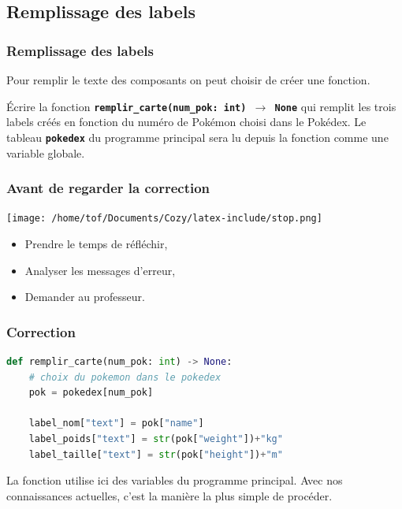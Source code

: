 \documentclass[svgnames,11pt]{beamer}
\begin{document}
\subsection{Remplissage des labels}
\begin{frame}
    \frametitle{Remplissage des labels}

    Pour remplir le texte des composants on peut choisir de créer une fonction.
    \begin{activite}
        Écrire la fonction \textbf{\texttt{remplir\_carte(num\_pok: int) $\rightarrow$ None}} qui remplit les trois labels créés en fonction du numéro de Pokémon choisi dans le Pokédex. Le tableau \textbf{\texttt{pokedex}} du programme principal sera lu depuis la fonction comme une variable globale.
    \end{activite}
\end{frame}
\begin{frame}
    \frametitle{Avant de regarder la correction}
\begin{center}
    \centering
    \texttt{[image: /home/tof/Documents/Cozy/latex-include/stop.png]}
    \end{center}
{\Large
    \begin{itemize}
        \item Prendre le temps de réfléchir,
        \item Analyser les messages d'erreur,
        \item Demander au professeur.
    \end{itemize}
}
\end{frame}
\begin{frame}[fragile]
    \frametitle{Correction}
    \begin{center}
        \begin{lstlisting}[language=Python , basicstyle=\ttfamily\small, xleftmargin=1em, xrightmargin=1em]
def remplir_carte(num_pok: int) -> None:
    # choix du pokemon dans le pokedex
    pok = pokedex[num_pok]

    label_nom["text"] = pok["name"]
    label_poids["text"] = str(pok["weight"])+"kg"
    label_taille["text"] = str(pok["height"])+"m"
\end{lstlisting}
        \label{CODE}
    \end{center}

    \begin{aretenir}[Commentaire]
        La fonction utilise ici des variables du programme principal. Avec nos connaissances actuelles, c'est la manière la plus simple de procéder.
    \end{aretenir}
\end{frame}
\end{document}
